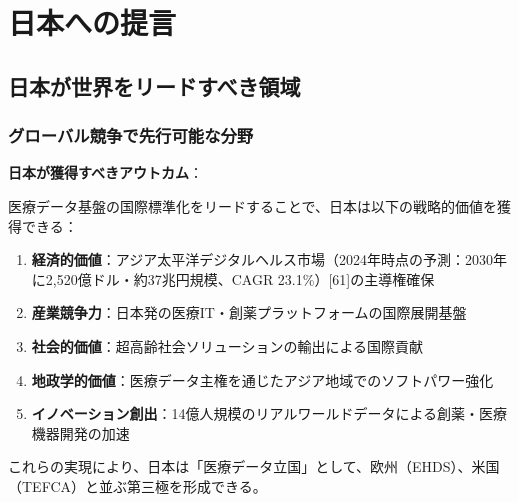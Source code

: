 \documentclass[
  a4paper,
  a4paper,
  11pt]{ltjsbook}
\providecommand{\tightlist}{%
  \setlength{\itemsep}{0pt}\setlength{\parskip}{0pt}}
\begin{document}
\chapter{日本への提言}\label{ux65e5ux672cux3078ux306eux63d0ux8a00}

\section{日本が世界をリードすべき領域}\label{ux65e5ux672cux304cux4e16ux754cux3092ux30eaux30fcux30c9ux3059ux3079ux304dux9818ux57df}

\subsection{グローバル競争で先行可能な分野}\label{ux30b0ux30edux30fcux30d0ux30ebux7af6ux4e89ux3067ux5148ux884cux53efux80fdux306aux5206ux91ce}

\begin{tcolorbox}[enhanced jigsaw, toprule=.15mm, bottomtitle=1mm, coltitle=black, left=2mm, opacityback=0, arc=.35mm, colbacktitle=quarto-callout-important-color!10!white, colback=white, opacitybacktitle=0.6, bottomrule=.15mm, rightrule=.15mm, breakable, title=\textcolor{quarto-callout-important-color}{\faExclamation}\hspace{0.5em}{Important}, toptitle=1mm, titlerule=0mm, colframe=quarto-callout-important-color-frame, leftrule=.75mm]

\textbf{日本が獲得すべきアウトカム}：

医療データ基盤の国際標準化をリードすることで、日本は以下の戦略的価値を獲得できる：

\begin{enumerate}
\def\labelenumi{\arabic{enumi}.}
\tightlist
\item
  \textbf{経済的価値}：アジア太平洋デジタルヘルス市場（2024年時点の予測：2030年に2,520億ドル・約37兆円規模、CAGR
  23.1\%）{[}61{]}の主導権確保
\item
  \textbf{産業競争力}：日本発の医療IT・創薬プラットフォームの国際展開基盤
\item
  \textbf{社会的価値}：超高齢社会ソリューションの輸出による国際貢献
\item
  \textbf{地政学的価値}：医療データ主権を通じたアジア地域でのソフトパワー強化
\item
  \textbf{イノベーション創出}：14億人規模のリアルワールドデータによる創薬・医療機器開発の加速
\end{enumerate}

これらの実現により、日本は「医療データ立国」として、欧州（EHDS）、米国（TEFCA）と並ぶ第三極を形成できる。

\end{tcolorbox}
\end{document}
